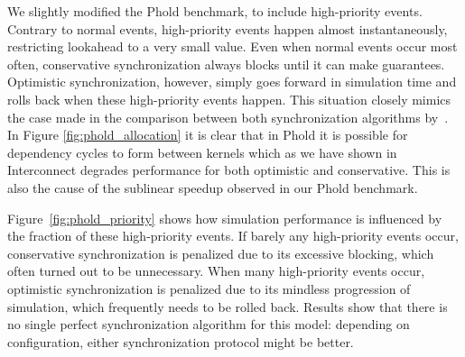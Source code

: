 We slightly modified the Phold benchmark, to include high-priority events.
Contrary to normal events, high-priority events happen almost instantaneously, restricting lookahead to a very small value.
Even when normal events occur most often, conservative synchronization always blocks until it can make guarantees.
Optimistic synchronization, however, simply goes forward in simulation time and rolls back when these high-priority events happen.
This situation closely mimics the case made in the comparison between both synchronization algorithms by~\cite{FujimotoBook}.
In Figure \ref{fig:phold_allocation} it is clear that in Phold it is possible for dependency cycles to form between kernels which as we have shown in Interconnect degrades performance for both optimistic and conservative. This is also the cause of the sublinear speedup observed in our Phold benchmark.

Figure~\ref{fig:phold_priority} shows how simulation performance is influenced by the fraction of these high-priority events.
If barely any high-priority events occur, conservative synchronization is penalized due to its excessive blocking, which often turned out to be unnecessary.
When many high-priority events occur, optimistic synchronization is penalized due to its mindless progression of simulation, which frequently needs to be rolled back.
Results show that there is no single perfect synchronization algorithm for this model: depending on configuration, either synchronization protocol might be better.
